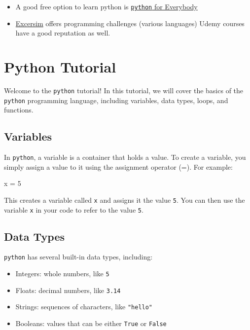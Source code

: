 \documentclass[
  letterpaper,
]{article}
\newenvironment{Shaded}{\begin{snugshade}}{\end{snugshade}}
\newcommand{\DecValTok}[1]{\textcolor[rgb]{0.68,0.00,0.00}{#1}}
\newcommand{\NormalTok}[1]{\textcolor[rgb]{0.00,0.23,0.31}{#1}}
\newcommand{\OperatorTok}[1]{\textcolor[rgb]{0.37,0.37,0.37}{#1}}
\providecommand{\tightlist}{%
  \setlength{\itemsep}{0pt}\setlength{\parskip}{0pt}}\usepackage{longtable,booktabs,array}
\begin{document}
\begin{itemize}
\tightlist
\item
  A good free option to learn python is
  \href{https://www.py4e.com/}{\texttt{python} for Everybody}
\item
  \href{https://exercism.org/}{Excersim} offers programming challenges
  (various languages) Udemy courses have a good reputation as well.
\end{itemize}

\hypertarget{python-tutorial}{%
\section{Python Tutorial}\label{python-tutorial}}

Welcome to the \texttt{python} tutorial! In this tutorial, we will cover
the basics of the \texttt{python} programming language, including
variables, data types, loops, and functions.

\hypertarget{variables}{%
\subsection{Variables}\label{variables}}

In \texttt{python}, a variable is a container that holds a value. To
create a variable, you simply assign a value to it using the assignment
operator (=). For example:

\begin{Shaded}
\begin{Highlighting}[]
\NormalTok{x }\OperatorTok{=} \DecValTok{5}
\end{Highlighting}
\end{Shaded}

This creates a variable called \texttt{x} and assigns it the value
\texttt{5}. You can then use the variable \texttt{x} in your code to
refer to the value \texttt{5}.

\hypertarget{data-types}{%
\subsection{Data Types}\label{data-types}}

\texttt{python} has several built-in data types, including:

\begin{itemize}
\tightlist
\item
  Integers: whole numbers, like \texttt{5}
\item
  Floats: decimal numbers, like \texttt{3.14}
\item
  Strings: sequences of characters, like \texttt{"hello"}
\item
  Booleans: values that can be either \texttt{True} or \texttt{False}
\end{itemize}
\end{document}
